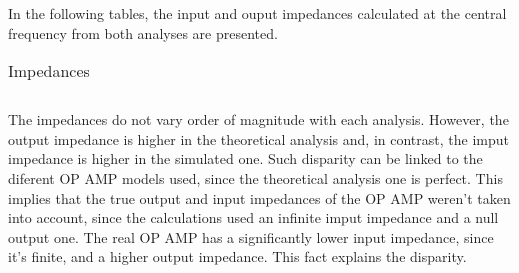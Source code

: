 In the following tables, the input and ouput impedances calculated at the central frequency from both analyses are presented.
\begin{table}[h!]
  \centering
  \begin{tabular}{|l|l|l|}
    \hline    
    
    
    
    \hline
  \end{tabular}
  \caption{Impedances}
\end{table}
\FloatBarrier   
The impedances do not vary order of magnitude with each analysis. However, the output impedance is higher in the theoretical analysis and, in contrast, the imput impedance is higher in the simulated one. Such disparity can be linked to the diferent OP AMP models used, since the theoretical analysis one is perfect. This implies that the true output and input impedances of the OP AMP weren't taken into account, since the calculations used an infinite imput impedance and a null output one. The real OP AMP has a significantly lower input impedance, since it's finite, and a higher output impedance. This fact explains the disparity. 


